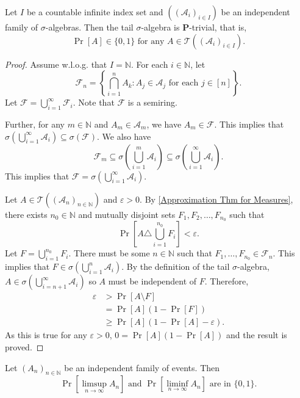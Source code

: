 \begin{theorem}
    Let $I$ be a countable infinite index set and $((\mathcal{A}_i)_{i\in I})$ be an independent family of $\sigma$-algebras. Then the tail $\sigma$-algebra is $\textbf{P}$-trivial, that is,
    $$\Pr[A]\in\{0,1\}\text{ for any }A\in\mathcal{T}((\mathcal{A}_i)_{i\in I}).$$
\end{theorem}
\begin{proof}
    Assume w.l.o.g. that $I=\mathbb{N}$. For each $i\in\mathbb{N}$, let
    $$\mathcal{F}_n = \left\{\bigcap_{i=1}^n A_k: A_j\in\mathcal{A}_j\text{ for each }j\in[n]\right\}.$$
    Let $\mathcal{F}=\bigcup_{i=1}^\infty \mathcal{F}_i$. Note that $\mathcal{F}$ is a semiring.
    
    \vspace{1mm}
    Further, for any $m\in\mathbb{N}$ and $A_m\in\mathcal{A}_m$, we have $A_m\in\mathcal{F}$. This implies that $\sigma\left(\bigcup_{i=1}^\infty \mathcal{A}_i\right)\subseteq\sigma(\mathcal{F})$. We also have
    $$\mathcal{F}_m\subseteq\sigma\left(\bigcup_{i=1}^m \mathcal{A}_i\right)\subseteq\sigma\left(\bigcup_{i=1}^\infty \mathcal{A}_i\right).$$
    This implies that $\mathcal{F} = \sigma\left(\bigcup_{i=1}^\infty \mathcal{A}_i\right)$.
    
    Let $A\in\mathcal{T}((\mathcal{A}_n)_{n\in\mathbb{N}})$ and $\varepsilon>0$. By \cref{Approximation Thm for Measures}, there exists $n_0\in\mathbb{N}$ and mutually disjoint sets $F_1,F_2,\ldots,F_{n_0}$ such that $$\Pr\left[A\triangle \bigcup_{i=1}^{n_0}F_i\right]<\varepsilon.$$
    Let $F=\bigcup_{i=1}^{n_0}F_i$. There must be some $n\in\mathbb{N}$ such that $F_1,\ldots,F_{n_0}\in \mathcal{F}_n$. This implies that $F\in\sigma(\bigcup_{i=1}^n \mathcal{A}_i)$. By the definition of the tail $\sigma$-algebra, $A\in\sigma(\bigcup_{i=n+1}^\infty\mathcal{A}_i)$ so $A$ must be independent of $F$. Therefore,
    \begin{align*}
        \varepsilon &> \Pr[A\setminus F] \\
        &= \Pr[A](1-\Pr[F]) \\
        &\geq \Pr[A](1-\Pr[A]-\varepsilon).
    \end{align*}
    As this is true for any $\varepsilon>0$, $0=\Pr[A](1-\Pr[A])$ and the result is proved.
\end{proof}

\begin{corollary}
    Let $(A_n)_{n\in\mathbb{N}}$ be an independent family of events. Then
    $$\Pr\left[\limsup_{n\to\infty} A_n\right]\text{ and }\Pr\left[\liminf_{n\to\infty} A_n\right]\text{ are in }\{0,1\}.$$
\end{corollary}

